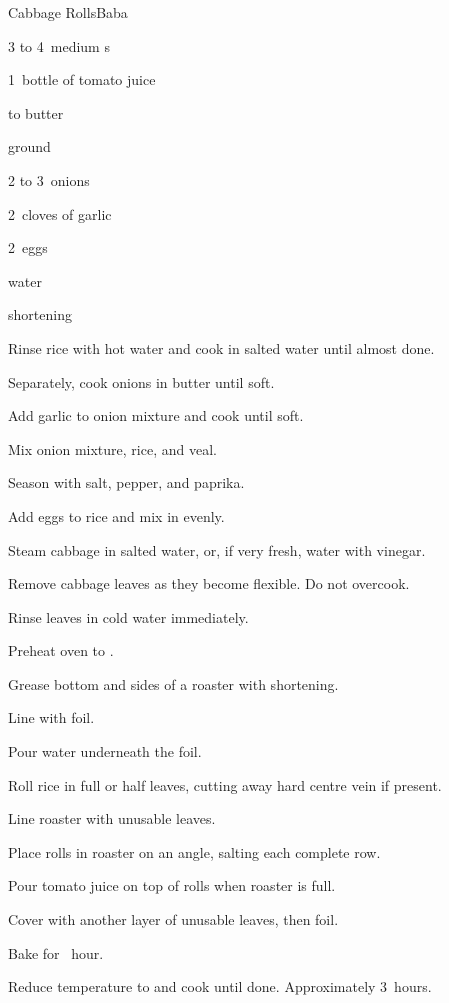 \begin{recipe}{Cabbage Rolls}{Baba}{}

\begin{ingredients}
\item 3 to 4~medium s
\item 1~bottle of tomato juice
\item {} 
\item \lbs{\quarter} to \lbs{\half} butter
\item {} ground 
\item 2 to 3~onions
\item 2~cloves of garlic
\item 2~eggs
\item {} water
\item shortening
\end{ingredients}

\begin{directions}
\item Rinse rice with hot water and cook in salted water until almost done.
\item Separately, cook onions in butter until soft.
\item Add garlic to onion mixture and cook until soft.
\item Mix onion mixture, rice, and veal.
\item Season with salt, pepper, and paprika.
\item Add eggs to rice and mix in evenly.
\item Steam cabbage in salted water, or, if very fresh, water with vinegar.
\item Remove cabbage leaves as they become flexible. Do not overcook.
\item Rinse leaves in cold water immediately.
\item Preheat oven to .
\item Grease bottom and sides of a roaster with shortening.
\item Line with foil.
\item Pour water underneath the foil.
\item Roll rice in full or half leaves, cutting away hard centre vein if present.
\item Line roaster with unusable leaves.
\item Place rolls in roaster on an angle, salting each complete row.
\item Pour tomato juice on top of rolls when roaster is full.
\item Cover with another layer of unusable leaves, then foil.
\item Bake for \half~hour.
\item Reduce temperature to  and cook until done. Approximately 3~hours.
\end{directions}

\end{recipe}

